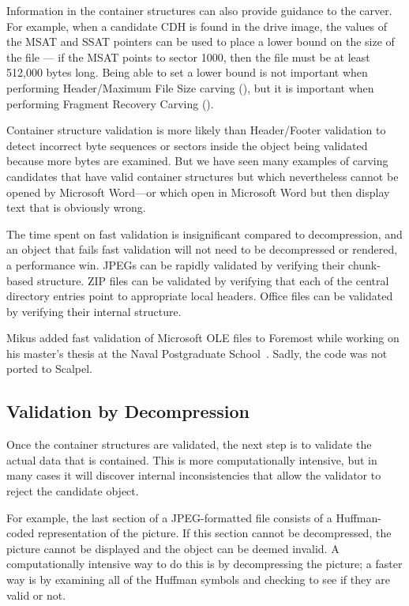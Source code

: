 \documentclass[11pt,letter]{article}
\begin{document}
Information in the container structures can also provide guidance to
the carver. For example, when a candidate CDH is found in the drive
image, the values of the MSAT and SSAT pointers can be used to place a
lower bound on the size of the file --- if the MSAT points to sector
1000, then the file must be at least 512,000 bytes long. Being able to
set a lower bound is not important when performing Header/Maximum File
Size carving (), but it is important when
performing Fragment Recovery Carving ().

Container structure validation is more likely than Header/Footer
validation to detect incorrect
byte sequences or sectors inside the object being validated because
more bytes are examined. But we have seen many examples of
carving candidates
that have valid container structures but which
nevertheless cannot be opened by Microsoft Word---or which open in
Microsoft Word but then display text that is obviously wrong. 

The time spent on fast
validation is insignificant compared to decompression, and an object
that fails fast validation will not need to be decompressed or
rendered, a performance win. JPEGs can be rapidly validated by
verifying their chunk-based structure. ZIP files can be validated by
verifying that each of the central directory entries point to
appropriate local headers. Office files can be validated by verifying
their internal structure.

Mikus added fast validation of Microsoft OLE files to Foremost while
working on his master's thesis at the Naval Postgraduate
School~\cite{mikus}. Sadly, the code was not ported to Scalpel. 



\subsection{Validation by Decompression}
Once the container structures are validated, the next step is to
validate the actual data that is contained. This is more
computationally intensive, but in many cases it will discover internal
inconsistencies that allow the validator to reject the candidate object.

For example, the last section of a JPEG-formatted file consists of a
Huffman-coded representation of the picture. If this section cannot be
decompressed, the picture cannot be displayed and the object can be
deemed invalid. A computationally intensive way to do this is by
decompressing the picture; a faster way is by examining all
of the Huffman symbols and checking to see if they are valid or not.
\end{document}
